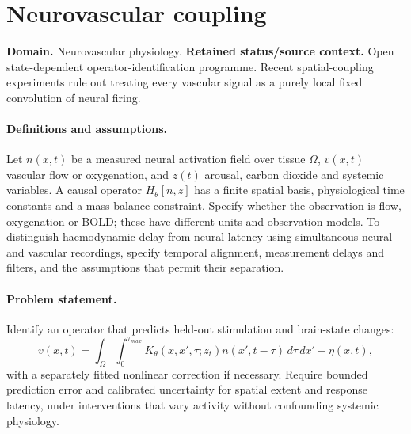 \documentclass[11pt]{article}
\begin{document}
\section*{Neurovascular coupling}
\label{prob:120}
\label{rank:83}
\par\smallskip

\noindent\textbf{Domain.} Neurovascular physiology. \quad \textbf{Retained status/source context.} Open state-dependent operator-identification programme. Recent spatial-coupling experiments rule out treating every vascular signal as a purely local fixed convolution of neural firing.
\paragraph{Definitions and assumptions.} Let $n(x,t)$ be a measured neural activation field over tissue $\Omega$, $v(x,t)$ vascular flow or oxygenation, and $z(t)$ arousal, carbon dioxide and systemic variables. A causal operator $H_\theta[n,z]$ has a finite spatial basis, physiological time constants and a mass-balance constraint. Specify whether the observation is flow, oxygenation or BOLD; these have different units and observation models. To distinguish haemodynamic delay from neural latency using simultaneous neural and vascular recordings, specify temporal alignment, measurement delays and filters, and the assumptions that permit their separation.
\paragraph{Problem statement.} Identify an operator that predicts held-out stimulation and brain-state changes:
\[
 v(x,t)=\int_\Omega\int_0^{\tau_{max}}K_\theta(x,x',\tau;z_t)n(x',t-\tau)\,d\tau\,dx'+\eta(x,t),
\]
with a separately fitted nonlinear correction if necessary. Require bounded prediction error and calibrated uncertainty for spatial extent and response latency, under interventions that vary activity without confounding systemic physiology.
\end{document}
